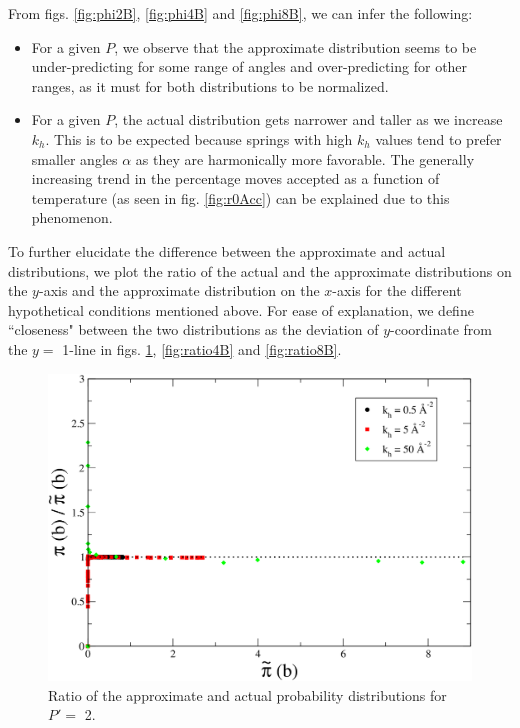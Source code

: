                 From figs. \ref{fig:phi2B}, \ref{fig:phi4B} and \ref{fig:phi8B}, we can infer the following:
                \begin{itemize}
                    \item For a given $P$, we observe that the approximate distribution seems to be under-predicting for some range of angles and over-predicting for other ranges, as it must for both distributions to be normalized.
                    \item For a given $P$, the actual distribution gets narrower and taller as we increase $k_h$. This is to be expected because springs with high $k_h$ values tend to prefer smaller angles $\alpha$ as they are harmonically more favorable. The generally increasing trend in the percentage moves accepted as a function of temperature (as seen in fig. \ref{fig:r0Acc}) can be explained due to this phenomenon.
                \end{itemize}

                To further elucidate the difference between the approximate and actual distributions, we plot the ratio of the actual and the approximate distributions on the $y$-axis and the approximate distribution on the $x$-axis for the different hypothetical conditions mentioned above. For ease of explanation, we define ``closeness" between the two distributions as the deviation of $y$-coordinate from the $y =$ 1-line in figs. \ref{fig:ratio2B}, \ref{fig:ratio4B} and \ref{fig:ratio8B}.

                \begin{figure}[!htbp]
                    \centering
                    \includegraphics[scale=0.20,keepaspectratio]{Chapter-4/Figures/ratio2B.png}
                    \caption{Ratio of the approximate and actual probability distributions for $P' =$ 2.}
                    \label{fig:ratio2B}
                \end{figure}

